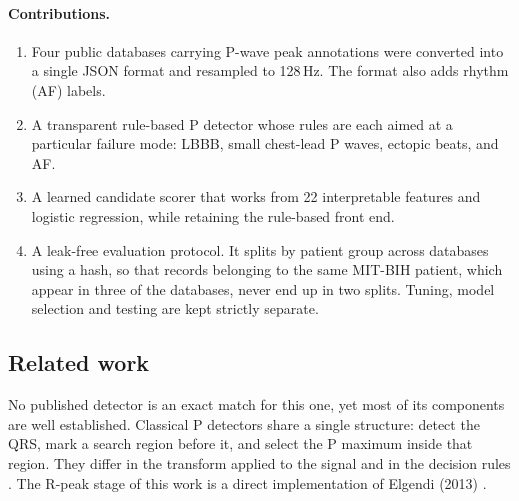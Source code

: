 \documentclass[11pt,a4paper]{article}
\begin{document}
\paragraph{Contributions.}
\begin{enumerate}
\item Four public databases carrying P-wave peak annotations were converted into a single JSON format and resampled to 128\,Hz. The format also adds rhythm (AF) labels.
\item A transparent rule-based P detector whose rules are each aimed at a particular failure mode: LBBB, small chest-lead P waves, ectopic beats, and AF.
\item A learned candidate scorer that works from 22 interpretable features and logistic regression, while retaining the rule-based front end.
\item A leak-free evaluation protocol. It splits by patient group across databases using a hash, so that records belonging to the same MIT-BIH patient, which appear in three of the databases, never end up in two splits. Tuning, model selection and testing are kept strictly separate.
\end{enumerate}

\subsection{Related work}

No published detector is an exact match for this one, yet most of its components are well established. Classical P detectors share a single structure: detect the QRS, mark a search region before it, and select the P maximum inside that region. They differ in the transform applied to the signal and in the decision rules \cite{martinez2004,saclova2022}. The R-peak stage of this work is a direct implementation of Elgendi (2013) \cite{elgendi2013}.
\end{document}
